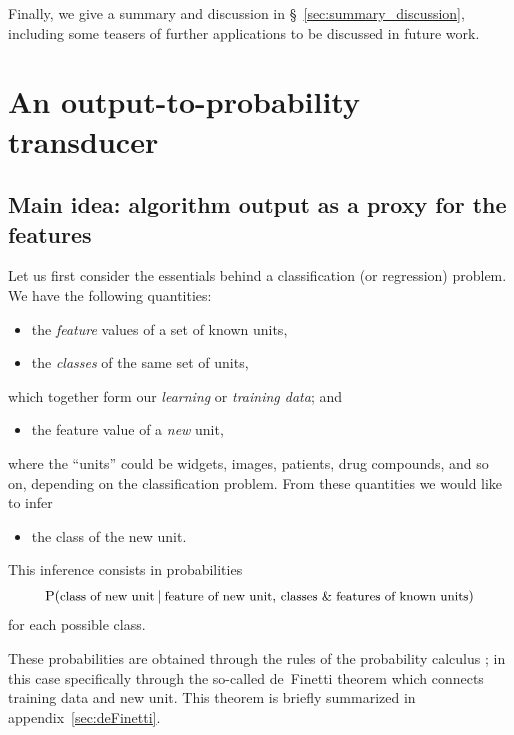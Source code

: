 \documentclass[\ifafour a4paper,12pt,\else a5paper,10pt,\fi%
onecolumn,oneside,article,%
british%
]{memoir}
\theoremstyle{remark}
\theoremstyle{innote}
\newcommand*{\amp}{\&}
\newcommand*{\pencil}{{\fontencoding{U}\fontfamily{fontawesometwo}\selectfont\symbol{210}}}
\newcommand{\mynotep}[1]{{\footnotesize\color{notecolour}\pencil\ #1}}
\renewcommand*{\P}{\mathrm{P}}%
\renewcommand*{\|}[1][]{\nonscript\:#1\vert\nonscript\:\mathopen{}}
\newcommand*{\sect}{\S}%
\newcommand*{\chap}{ch.}%
\newcommand*{\chaps}{chs}%
\newcommand*{\texts}[1]{\text{\small #1}}
\begin{document}
Finally, we give a summary and discussion in \sect~\ref{sec:summary_discussion}, including some teasers of further applications to be discussed in future work.


\section{An output-to-probability transducer}
\label{sec:transducer}




\subsection{Main idea: algorithm output as a proxy for the features}
\label{sec:essential_idea}

Let us first consider the essentials behind a classification (or regression) problem. We have the following quantities:
\begin{itemize}
\item the \emph{feature} values of a set of known units,
\item the \emph{classes} of the same set of units,
\end{itemize}
which together form our \emph{learning} or \emph{training data}; and
\begin{itemize}[resume]
\item the feature value of a \emph{new} unit,
\end{itemize}
where the \enquote{units} could be widgets, images, patients, drug compounds, and so on, depending on the classification problem. From these quantities we would like to infer
\begin{itemize}[resume]
\item  the class of the new unit.
\end{itemize}
This inference consists in probabilities
\begin{equation}
  \label{eq:prob_essential}
  \P(\texts{class of new unit} \| \texts{feature of new unit},\,
  \texts{classes \amp\ features of known units})
\end{equation}
for each possible class.

These probabilities are obtained through the rules of the probability calculus \autocites{jaynes1994_r2003}[\chaps~12--13]{russelletal1995_r2022}[\addcolon see further references in appendix~\ref{sec:maths_transducer}]{gregory2005,hailperin2011,jeffreys1939_r1983}; in this case specifically through the so-called de~Finetti theorem \autocites[\chap~4]{bernardoetal1994_r2000}{dawid2013} which connects training data and new unit. This theorem is briefly summarized in appendix~\ref{sec:deFinetti}.
\end{document}

